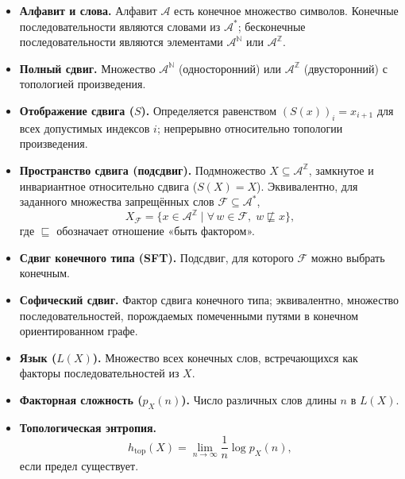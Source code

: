 \documentclass[a4paper,14pt]{extreport}
\theoremstyle{plain}
\theoremstyle{definition}
\theoremstyle{remark}
\begin{document}
\begin{itemize}
	\item \textbf{Алфавит и слова.} Алфавит $\mathcal{A}$ есть конечное множество символов. Конечные последовательности являются словами из $\mathcal{A}^*$; бесконечные последовательности являются элементами $\mathcal{A}^{\mathbb{N}}$ или $\mathcal{A}^{\mathbb{Z}}$.
	
	\item \textbf{Полный сдвиг.} Множество $\mathcal{A}^{\mathbb{N}}$ (односторонний) или $\mathcal{A}^{\mathbb{Z}}$ (двусторонний) с топологией произведения.
	
	\item \textbf{Отображение сдвига ($S$).} Определяется равенством 
	$(S(x))_i = x_{i+1}$ для всех допустимых индексов $i$; 
	непрерывно относительно топологии произведения.
	
	\item \textbf{Пространство сдвига (подсдвиг).} Подмножество 
	$X \subseteq \mathcal{A}^{\mathbb{Z}}$, замкнутое и 
	инвариантное относительно сдвига ($S(X) = X$). Эквивалентно, для заданного множества запрещённых слов $\mathcal{F} \subseteq \mathcal{A}^*$,
	\begin{equation}
		X_{\mathcal{F}} = \bigl\{ x \in \mathcal{A}^{\mathbb{Z}} 
		\mid \forall\, w \in \mathcal{F},\; w \not\sqsubseteq x 
		\bigr\},
	\end{equation}
	где $\sqsubseteq$ обозначает отношение «быть фактором».
	
	\item \textbf{Сдвиг конечного типа (SFT).} Подсдвиг, 
	для которого $\mathcal{F}$ можно выбрать конечным.
	
	\item \textbf{Софический сдвиг.} Фактор сдвига конечного 
	типа; эквивалентно, множество последовательностей, порождаемых 
	помеченными путями в конечном ориентированном графе.
	
	\item \textbf{Язык ($L(X)$).} Множество всех конечных слов, встречающихся как факторы последовательностей из $X$.
	
	\item \textbf{Факторная сложность ($p_X(n)$).} Число различных слов длины $n$ в $L(X)$.
	
	\item \textbf{Топологическая энтропия.} 
	\begin{equation}
		h_{\mathrm{top}}(X) = \lim_{n \to \infty} 
		\frac{1}{n} \log p_X(n),
	\end{equation}
	если предел существует.
\end{itemize}
\end{document}
